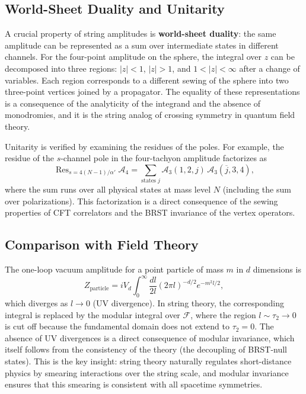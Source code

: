 \documentclass[11pt]{article}
\renewcommand{\bar}{\overline}
\begin{document}
\subsection{World-Sheet Duality and Unitarity}

A crucial property of string amplitudes is \textbf{world-sheet duality}: the same amplitude can be represented as a sum over intermediate states in different channels. For the four-point amplitude on the sphere, the integral over $z$ can be decomposed into three regions: $|z|<1$, $|z|>1$, and $1<|z|<\infty$ after a change of variables. Each region corresponds to a different sewing of the sphere into two three-point vertices joined by a propagator. The equality of these representations is a consequence of the analyticity of the integrand and the absence of monodromies, and it is the string analog of crossing symmetry in quantum field theory.

Unitarity is verified by examining the residues of the poles. For example, the residue of the $s$-channel pole in the four-tachyon amplitude factorizes as
\begin{equation}
\mathop{\mathrm{Res}}_{s = 4(N-1)/\alpha'} \mathcal{A}_4 = \sum_{\text{states }j} \mathcal{A}_3(1,2,j) \, \mathcal{A}_3(\bar{j},3,4),
\end{equation}
where the sum runs over all physical states at mass level $N$ (including the sum over polarizations). This factorization is a direct consequence of the sewing properties of CFT correlators and the BRST invariance of the vertex operators.

\subsection{Comparison with Field Theory}

The one-loop vacuum amplitude for a point particle of mass $m$ in $d$ dimensions is
\begin{equation}
Z_{\text{particle}} = i V_d \int_0^\infty \frac{dl}{2l} (2\pi l)^{-d/2} e^{-m^2 l/2},
\end{equation}
which diverges as $l\to 0$ (UV divergence). In string theory, the corresponding integral is replaced by the modular integral over $\mathcal{F}$, where the region $l \sim \tau_2 \to 0$ is cut off because the fundamental domain does not extend to $\tau_2=0$. The absence of UV divergences is a direct consequence of modular invariance, which itself follows from the consistency of the theory (the decoupling of BRST-null states). This is the key insight: string theory naturally regulates short-distance physics by smearing interactions over the string scale, and modular invariance ensures that this smearing is consistent with all spacetime symmetries.
\end{document}
